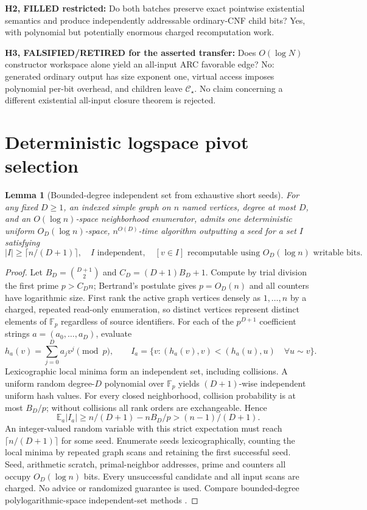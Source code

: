 \documentclass[11pt]{article}
\newtheorem{lemma}[theorem]{Lemma}
\newcommand{\CS}{\mathcal C_\star}
\begin{document}
\noindent\textbf{H2, FILLED restricted:} Do both batches preserve exact pointwise existential semantics and produce independently addressable ordinary-CNF child bits? Yes, with polynomial but potentially enormous charged recomputation work.

\noindent\textbf{H3, FALSIFIED/RETIRED for the asserted transfer:} Does $O(\log N)$ constructor workspace alone yield an all-input ARC favorable edge? No: generated ordinary output has size exponent one, virtual access imposes polynomial per-bit overhead, and children leave $\CS$. No claim concerning a different existential all-input closure theorem is rejected.

\section{Deterministic logspace pivot selection}
\begin{lemma}[Bounded-degree independent set from exhaustive short seeds]
For any fixed $D\ge1$, an indexed simple graph on $n$ named vertices, degree at most $D$, and an $O(\log n)$-space neighborhood enumerator, admits one deterministic uniform $O_D(\log n)$-space, $n^{O(D)}$-time algorithm outputting a seed for a set $I$ satisfying
\[
|I|\ge\lceil n/(D+1)\rceil,\quad I\text{ independent},\quad
[v\in I]\text{ recomputable using }O_D(\log n)\text{ writable bits}.
\]
\end{lemma}
\begin{proof}
Let $B_D=\binom{D+1}{2}$ and $C_D=(D+1)B_D+1$. Compute by trial division the first prime $p>C_Dn$; Bertrand's postulate gives $p=O_D(n)$ and all counters have logarithmic size. First rank the active graph vertices densely as $1,\ldots,n$ by a charged, repeated read-only enumeration, so distinct vertices represent distinct elements of $\mathbb F_p$ regardless of source identifiers. For each of the $p^{D+1}$ coefficient strings $a=(a_0,\ldots,a_D)$, evaluate
\[
h_a(v)=\sum_{j=0}^{D}a_jv^j\pmod p,\qquad
I_a=\{v:(h_a(v),v)<(h_a(u),u)\quad\forall u\sim v\}.
\]
Lexicographic local minima form an independent set, including collisions. A uniform random degree-$D$ polynomial over $\mathbb F_p$ yields $(D+1)$-wise independent uniform hash values. For every closed neighborhood, collision probability is at most $B_D/p$; without collisions all rank orders are exchangeable. Hence
\[
\mathbb E_a|I_a|\ge n/(D+1)-nB_D/p>(n-1)/(D+1).
\]
An integer-valued random variable with this strict expectation must reach $\lceil n/(D+1)\rceil$ for some seed. Enumerate seeds lexicographically, counting the local minima by repeated graph scans and retaining the first successful seed. Seed, arithmetic scratch, primal-neighbor addresses, prime and counters all occupy $O_D(\log n)$ bits. Every unsuccessful candidate and all input scans are charged. No advice or randomized guarantee is used. Compare bounded-degree polylogarithmic-space independent-set methods \cite{biswas}.
\end{proof}
\end{document}
